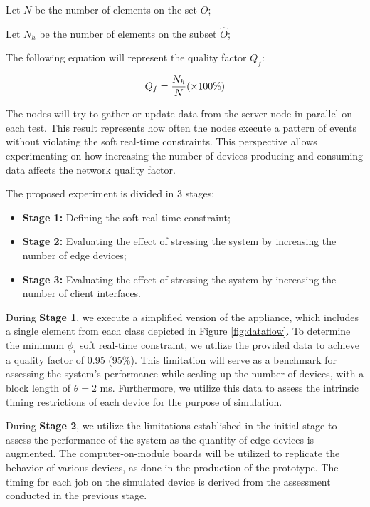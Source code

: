 \begin{definition}
    Let $N$ be the number of elements on the set $O$;
\end{definition}

\begin{definition}
    Let $N_h$ be the number of elements on the subset $\hat{O}$;
\end{definition}

The following equation will represent the quality factor $Q_f$:

\begin{equation}
    Q_f = \frac{N_h}{N} (\times 100 \%)\\
    \vspace{0.2cm}
\end{equation}

The nodes will try to gather or update data from the server node in parallel on each test. This result represents how often the nodes execute a pattern of events without violating the soft real-time constraints. This perspective allows experimenting on how increasing the number of devices producing and consuming data affects the network quality factor.

The proposed experiment is divided in 3 stages:

\begin{itemize}
    \item \textbf{Stage 1:} Defining the soft real-time constraint;
    \item \textbf{Stage 2:} Evaluating the effect of stressing the system by increasing the number of edge devices;
    \item \textbf{Stage 3:} Evaluating the effect of stressing the system by increasing the number of client interfaces.
\end{itemize}

During \textbf{Stage 1}, we execute a simplified version of the appliance, which includes a single element from each class depicted in Figure \ref{fig:dataflow}. To determine the minimum $\phi_i$ soft real-time constraint, we utilize the provided data to achieve a quality factor of 0.95 (95\%). This limitation will serve as a benchmark for assessing the system's performance while scaling up the number of devices, with a block length of $\theta = 2$ ms. Furthermore, we utilize this data to assess the intrinsic timing restrictions of each device for the purpose of simulation.

During \textbf{Stage 2}, we utilize the limitations established in the initial stage to assess the performance of the system as the quantity of edge devices is augmented. The computer-on-module boards will be utilized to replicate the behavior of various devices, as done in the production of the prototype. The timing for each job on the simulated device is derived from the assessment conducted in the previous stage.

